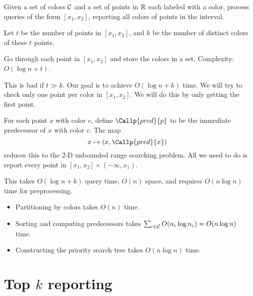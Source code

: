 
\begin{question*}
    Given a set of colors $\mathcal{C}$ and a set of points in $\mathbb{R}$ each labeled
    with a color, process queries of the form $[x_1, x_2]$,
    reporting all colors of points in the interval.
\end{question*}

Let $t$ be the number of points in $[x_1, x_2]$, and $k$ be the number of
distinct colors of these $t$ points.
\begin{solution}[Naive]
    Go through each point in $[x_1, x_2]$ and store the colors in a set.
    Complexity: $O(\log n + t)$.
\end{solution}
This is bad if $t \gg k$.
Our goal is to achieve $O(\log n + k)$ time.
We will try to check only one point per color in $[x_1, x_2]$.
We will do this by only getting the first point.

\begin{solution}
    For each point $x$ with color $c$, define $\Callp{pred}{p}$ to be the
    immediate predecessor of $x$ with color $c$.
    The map \[
        x \mapsto (x, \Callp{pred}{x})
    \] reduces this to the 2-D unbounded range searching problem.
    All we need to do is report every point in
    $[x_1, x_2] \times (-\infty, x_1)$.

    This takes $O(\log n + k)$ query time, $O(n)$ space, and requires
    $O(n \log n)$ time for preprocessing.
    \begin{itemize}
        \item Partitioning by colors takes $O(n)$ time.
        \item Sorting and computing predecessors takes
            $\sum_{c \in \mathcal{C}} O(n_c \log n_c) = O(n \log n)$ time.
        \item Constructing the priority search tree takes
            $O(n \log n)$ time.
    \end{itemize}
\end{solution}

\section{Top $k$ reporting} \label{sec:ors:topk}
\TODO[AAAAAA] %
